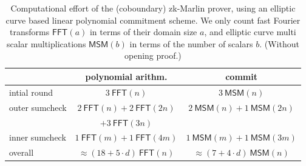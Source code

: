 \documentclass[10pt,article,oneside]{memoir}
\theoremstyle{definition}
\theoremstyle{remark}
\begin{document}
\begin{table}[h!]
\caption{%
Computational effort of the (coboundary) zk-Marlin prover, using an elliptic curve based linear polynomial commitment scheme. 
We only count fast Fourier transforms $\textsf{FFT}(a)$ in terms of their domain size $a$, and elliptic curve multi scalar multiplications $\textsf{MSM}(b)$ in terms of the number of scalars $b$. 
(Without opening proof.)
}
\label{t:CoboundaryMarlin}
\vspace*{3mm}
\centering
\hspace*{-0.5cm}
\begin{tabular}{|l|c|c|}
\cline{2-3}
\multicolumn{1}{c|}{} &polynomial arithm. & commit
\\\hline
 intial round  &  $3 ~\textsf{FFT}(n)$   & $3~\textsf{MSM}(n)$
\\
%
%
\multirow{2}{*}{%
outer sumcheck}  
	&  $2 ~\textsf{FFT}(n) + 2~\textsf{FFT}(2n)$%
		& \multirow{2}{*}{$2 ~\textsf{MSM}(n) + 1~\textsf{MSM}(2n)$}
\\ & $+ 3~\textsf{FFT}(3n)$ &
\\
%
%
inner sumcheck  
	& $1~\textsf{FFT}(m) + 1~\textsf{FFT}(4m) $
		& $1~\textsf{MSM}(m) +1~\textsf{MSM}(3m)$ 

\\\hline
overall 
	 &  $\approx  (18 + 5\cdot d)~\textsf{FFT}(n)$ 
		& $\approx (7+4\cdot d)~\textsf{MSM}(n)$\footnotemark
\\\hline
\end{tabular}
\end{table}
\end{document}
